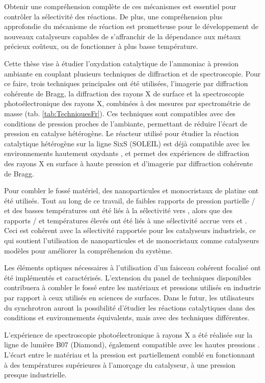 Obtenir une compréhension complète de ces mécanismes est essentiel pour contrôler la sélectivité des réactions.
De plus, une compréhension plus approfondie du mécanisme de réaction est prometteuse pour le développement de nouveaux catalyseurs capables de s’affranchir de la dépendance aux métaux précieux coûteux, ou de fonctionner à plus basse température.

Cette thèse vise à étudier l'oxydation catalytique de l'ammoniac à pression ambiante en couplant plusieurs techniques de diffraction et de spectroscopie.
Pour ce faire, trois techniques principales ont été utilisées, l'imagerie par diffraction cohérente de Bragg, la diffraction des rayons X de surface et la spectroscopie photoélectronique des rayons X, combinées à des mesures par spectrométrie de masse (tab. \ref{tab:TechniquesFr}).
Ces techniques sont compatibles avec des conditions de pression proches de l'ambiante, permettant de réduire l'écart de pression en catalyse hétérogène.
Le réacteur utilisé pour étudier la réaction catalytique hétérogène sur la ligne SixS (SOLEIL) est déjà compatible avec les environnements hautement oxydants \parencite{VanRijn2010, Resta2020a}, et permet des expériences de diffraction des rayons X en surface à haute pression et d'imagerie par diffraction cohérente de Bragg.

Pour combler le fossé matériel, des nanoparticules et monocristaux de platine ont été utilisés.
Tout au long de ce travail, de faibles rapports de pression partielle / et des basses températures ont été liés à la sélectivité vers , alors que des rapports / et températures élevés ont été liés à une sélectivité accrue vers  et .
Ceci est cohérent avec la sélectivité rapportée pour les catalyseurs industriels, ce qui soutient l'utilisation de nanoparticules et de monocristaux comme catalyseurs modèles pour améliorer la compréhension du système.

Les éléments optiques nécessaires à l'utilisation d'un faisceau cohérent focalisé ont été implémentés et caractérisés.
L'extension du panel de techniques disponibles contribuera à combler le fossé entre les matériaux et pressions utilisés en industrie par rapport à ceux utilisés en sciences de surfaces.
Dans le futur, les utilisateurs du synchrotron auront la possibilité d'étudier les réactions catalytiques dans des conditions et environnements équivalents, mais avec des techniques différentes.

L'expérience de spectroscopie photoélectronique à rayons X a été réalisée sur la ligne de lumière B07 (Diamond), également compatible avec les hautes pressions \parencite{Held2020}.
L'écart entre le matériau et la pression est partiellement comblé en fonctionnant à des températures supérieures à l'amorçage du catalyseur, à une pression presque industrielle.

